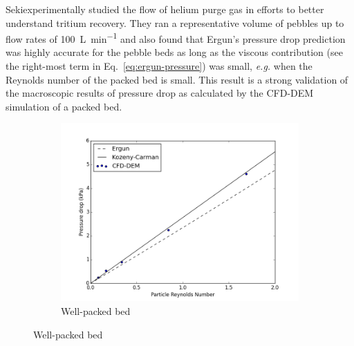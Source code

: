 Seki\etal experimentally studied the flow of helium purge gas in efforts to better understand tritium recovery.\cite{Seki2013a} They ran a representative volume of pebbles up to flow rates of \SI{100}{\liter\per\minute} and also found that Ergun's pressure drop prediction was highly accurate for the pebble beds as long as the viscous contribution (see the right-most term in Eq.~\ref{eq:ergun-pressure}) was small, \textit{e.g.} when the Reynolds number of the packed bed is small. This result is a strong validation of the macroscopic results of pressure drop as calculated by the CFD-DEM simulation of a packed bed.

\begin{figure}
        \centering
        \begin{subfigure}[b]{0.7\textwidth}
                \includegraphics[width=\textwidth]{figures/pressureDrops-full.png}
                \caption{Well-packed bed}
                \label{fig:pressure-drop-full}
        \end{subfigure}%
        

\end{figure}
